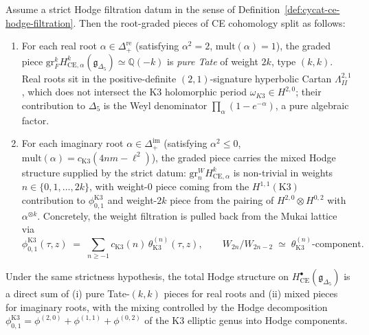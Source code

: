 \begin{theorem}
\label{thm:cycat-ce-hodge-real-imag}
Assume a strict Hodge filtration datum in the sense of
Definition~\textup{\ref{def:cycat-ce-hodge-filtration}}. Then the
root-graded pieces of CE cohomology split as follows:
\begin{enumerate}[label=(\roman*)]
 \item For each real root $\alpha \in \Delta_+^{\mathrm{re}}$
 (satisfying $\alpha^2 = 2$, $\mathrm{mult}(\alpha) = 1$), the
 graded piece
 $\mathrm{gr}^k_F H^k_{\mathrm{CE},\alpha}(\mathfrak{g}_{\Delta_5})
 \simeq \mathbb{Q}(-k)$
 is \emph{pure Tate} of weight $2k$, type $(k,k)$. Real roots sit in
 the positive-definite $(2,1)$-signature
 hyperbolic Cartan $\Lambda^{2,1}_{II}$, which does not intersect
 the K3 holomorphic period $\omega_{K3} \in H^{2,0}$; their
 contribution to $\Delta_5$ is the Weyl denominator
 $\prod_\alpha (1 - e^{-\alpha})$, a pure algebraic factor.
 \item For each imaginary root $\alpha \in \Delta_+^{\mathrm{im}}$
 (satisfying $\alpha^2 \leq 0$, $\mathrm{mult}(\alpha) =
 c_{\mathrm{K3}}(4nm - \ell^2)$), the graded piece carries the mixed
 Hodge structure supplied by the strict datum:
 $\mathrm{gr}^W_n H^k_{\mathrm{CE},\alpha}$
 is non-trivial in weights $n \in \{0, 1, \ldots, 2k\}$, with
 weight-0 piece coming from the $H^{1,1}(\mathrm{K3})$ contribution to
 $\phi_{0,1}^{\mathrm{K3}}$ and weight-$2k$ piece from the pairing
 of $H^{2,0} \otimes H^{0,2}$ with $\alpha^{\otimes k}$. Concretely, the
 weight filtration is pulled back from the Mukai lattice via
 \[
 \phi_{0,1}^{\mathrm{K3}}(\tau, z) \;=\;
 \sum_{n \geq -1} c_{\mathrm{K3}}(n) \, \theta_{\mathrm{K3}}^{(n)}(\tau, z),
 \qquad
 W_{2n}/W_{2n-2} \;\simeq\; \theta_{\mathrm{K3}}^{(n)}\text{-component}.
 \]
\end{enumerate}
Under the same strictness hypothesis, the total Hodge structure on
$H^\bullet_{\mathrm{CE}}(\mathfrak{g}_{\Delta_5})$
is a direct sum of (i) pure Tate-$(k,k)$ pieces for real roots and
(ii) mixed pieces for imaginary roots, with the mixing controlled by
the Hodge decomposition $\phi_{0,1}^{\mathrm{K3}} = \phi^{(2,0)} +
\phi^{(1,1)} + \phi^{(0,2)}$ of the K3 elliptic genus into Hodge
components.
\end{theorem}

